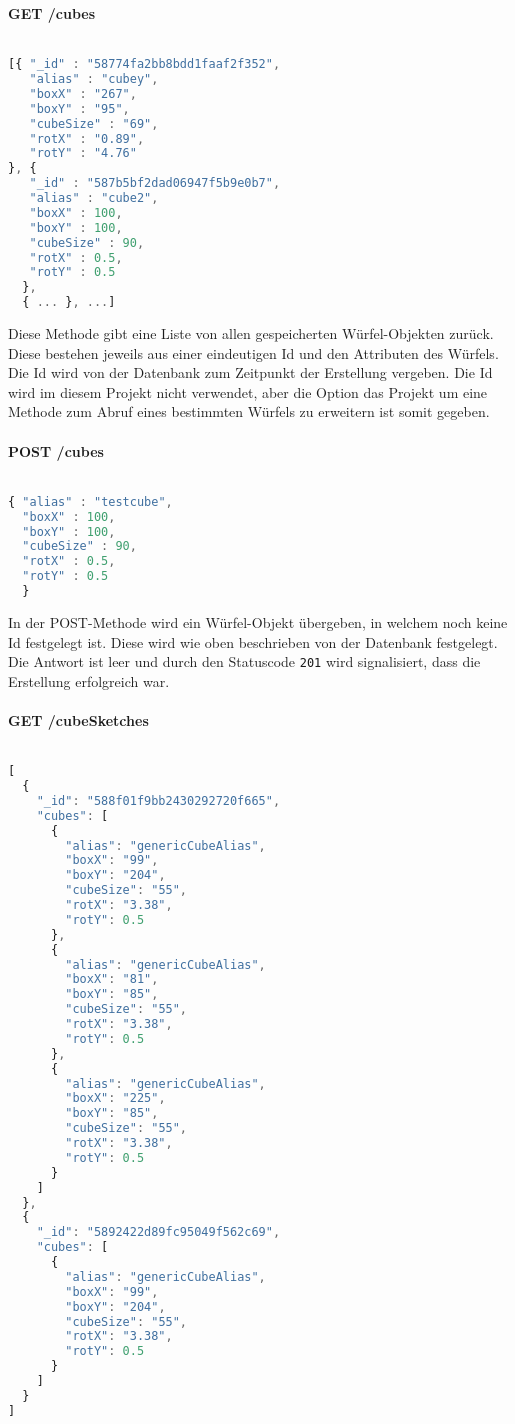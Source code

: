 \documentclass[12pt, ngerman, utf8]{article}
\begin{document}
\textbf{GET /cubes}\\\\
\begin{lstlisting}[language=JavaScript, caption={Response-Body der GET-Operation auf "/cubes"},label={cubesget}]
[{ "_id" : "58774fa2bb8bdd1faaf2f352",
   "alias" : "cubey",
   "boxX" : "267",
   "boxY" : "95",
   "cubeSize" : "69",
   "rotX" : "0.89",
   "rotY" : "4.76"
}, { 
   "_id" : "587b5bf2dad06947f5b9e0b7",
   "alias" : "cube2",
   "boxX" : 100,
   "boxY" : 100,
   "cubeSize" : 90,
   "rotX" : 0.5,
   "rotY" : 0.5
  }, 
  { ... }, ...]
\end{lstlisting}
Diese Methode gibt eine Liste von allen gespeicherten Würfel-Objekten zurück. Diese bestehen jeweils aus einer eindeutigen Id und den Attributen des Würfels. Die Id wird von der Datenbank zum Zeitpunkt der Erstellung vergeben. Die Id wird im diesem Projekt nicht verwendet, aber die Option das Projekt um eine Methode zum Abruf eines bestimmten Würfels zu erweitern ist somit gegeben.
\\\\
\textbf{POST /cubes}\\\\
\begin{lstlisting}[language=JavaScript, caption={Request-Body der POST-Operation auf "/cubes"},label={cubespost}]
{ "alias" : "testcube",
  "boxX" : 100,
  "boxY" : 100,
  "cubeSize" : 90,
  "rotX" : 0.5,
  "rotY" : 0.5 
  }
\end{lstlisting}
In der POST-Methode wird ein Würfel-Objekt übergeben, in welchem noch keine Id festgelegt ist. Diese wird wie oben beschrieben von der Datenbank festgelegt. Die Antwort ist leer und durch den Statuscode \texttt{201} wird signalisiert, dass die Erstellung erfolgreich war.
\\\\
\textbf{GET /cubeSketches}\\\\
\begin{lstlisting}[language=JavaScript, caption={Response-Body der POST-Operation auf "/cubeSketches"},label={sketchget}]
[
  {
    "_id": "588f01f9bb2430292720f665",
    "cubes": [
      {
        "alias": "genericCubeAlias",
        "boxX": "99",
        "boxY": "204",
        "cubeSize": "55",
        "rotX": "3.38",
        "rotY": 0.5
      },
      {
        "alias": "genericCubeAlias",
        "boxX": "81",
        "boxY": "85",
        "cubeSize": "55",
        "rotX": "3.38",
        "rotY": 0.5
      },
      {
        "alias": "genericCubeAlias",
        "boxX": "225",
        "boxY": "85",
        "cubeSize": "55",
        "rotX": "3.38",
        "rotY": 0.5
      }
    ]
  },
  {
    "_id": "5892422d89fc95049f562c69",
    "cubes": [
      {
        "alias": "genericCubeAlias",
        "boxX": "99",
        "boxY": "204",
        "cubeSize": "55",
        "rotX": "3.38",
        "rotY": 0.5
      }
    ]
  }
]
\end{lstlisting}
\end{document}
